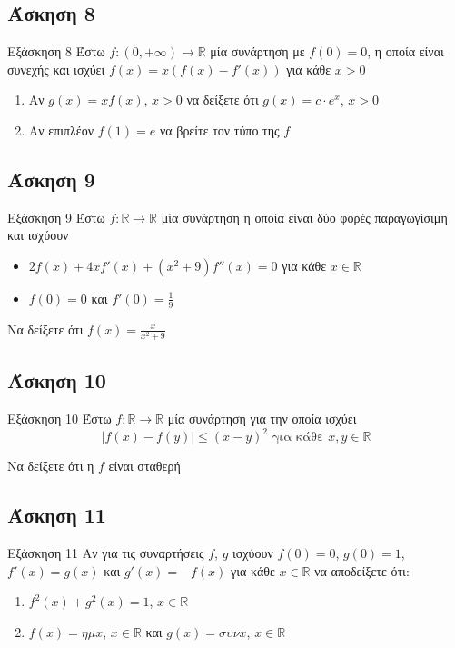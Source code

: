 \documentclass[greek]{beamer}
\begin{document}
\subsection{Άσκηση 8}
\begin{frame}[label=Άσκηση8]{Εξάσκηση 8}
  Έστω $f:(0,+\infty)\to\mathbb{R}$ μία συνάρτηση με $f(0)=0$, η οποία είναι συνεχής και ισχύει $f(x)=x(f(x)-f'(x))$ για κάθε $x>0$
  \begin{enumerate}
    \item<1-> Αν $g(x)=xf(x)$, $x>0$ να δείξετε ότι $g(x)=c\cdot e^x$, $x>0$
    \item<2-> Αν επιπλέον $f(1)=e$ να βρείτε τον τύπο της $f$
  \end{enumerate}

\end{frame}

\subsection{Άσκηση 9}
\begin{frame}[label=Άσκηση9]{Εξάσκηση 9}
  Έστω $f:\mathbb{R}\to\mathbb{R}$ μία συνάρτηση η οποία είναι δύο φορές παραγωγίσιμη και ισχύουν
  \begin{itemize}
    \item $2f(x)+4xf'(x)+(x^2+9)f''(x)=0$ για κάθε $x\in\mathbb{R}$
    \item $f(0)=0$ και $f'(0)=\frac{1}{9}$
  \end{itemize}

  Να δείξετε ότι $f(x)=\frac{x}{x^2+9}$

\end{frame}

\subsection{Άσκηση 10}
\begin{frame}[label=Άσκηση10]{Εξάσκηση 10}
  Έστω $f:\mathbb{R}\to\mathbb{R}$ μία συνάρτηση για την οποία ισχύει
  $$|f(x)-f(y)|\le (x-y)^2 \text{ για κάθε } x,y\in\mathbb{R}$$

  Να δείξετε ότι η $f$ είναι σταθερή

\end{frame}

\subsection{Άσκηση 11}
\begin{frame}[label=Άσκηση11]{Εξάσκηση 11}
  Αν για τις συναρτήσεις $f$, $g$ ισχύουν $f(0)=0$, $g(0)=1$, $f'(x)=g(x)$ και $g'(x)=-f(x)$ για κάθε $x\in\mathbb{R}$ να αποδείξετε ότι:
  \begin{enumerate}
    \item<1-> $f^2(x)+g^2(x)=1$, $x\in\mathbb{R}$
    \item<2-> $f(x)=ημx$, $x\in\mathbb{R}$ και $g(x)=συνx$, $x\in\mathbb{R}$
  \end{enumerate}

\end{frame}
\end{document}
